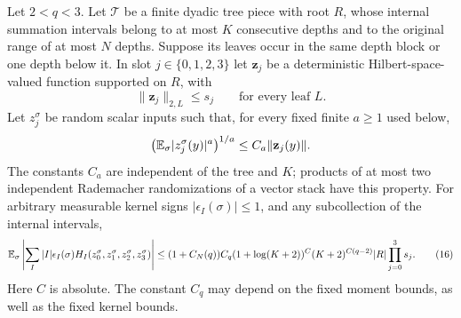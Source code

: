 \begin{lemma}\label{lem:short-block}
Let $2<q<3$.  Let $\mathcal T$ be a finite dyadic tree piece with root
$R$, whose internal summation intervals belong to at most $K$
consecutive depths and to the original range of at most $N$ depths.
Suppose its leaves occur in the same depth block or one depth below
it.  In slot $j\in\{0,1,2,3\}$ let $\mathbf z_j$ be a deterministic
Hilbert-space-valued function supported on $R$, with
\[
 \|\mathbf z_j\|_{2,L}\le s_j
 \qquad\text{for every leaf }L.
\]
Let $z_j^\sigma$ be random scalar inputs such that, for every fixed
finite $a\geq1$ used below,
\[
 \bigl(\mathbb E_\sigma|z_j^\sigma(y)|^a\bigr)^{1/a}
 \le C_a\|\mathbf z_j(y)\|.
\]
The constants $C_a$ are independent of the tree and $K$; products of at
most two independent Rademacher randomizations of a vector stack have
this property.  For arbitrary measurable kernel signs
$|\epsilon_I(\sigma)|\le1$, and any subcollection of the internal
intervals,
\[
 \mathbb E_\sigma\left|
   \sum_I |I|\epsilon_I(\sigma)
             H_I(z_0^\sigma,z_1^\sigma,z_2^\sigma,z_3^\sigma)
             \right|
 \le (1+C_N(q))C_q
       (1+\log(K+2))^C(K+2)^{C(q-2)}
       |R|\prod_{j=0}^3s_j .
 \tag{16}\label{eq:src-16}
\]
Here $C$ is absolute.  The constant $C_q$ may depend on the fixed
moment bounds, as well as the fixed kernel bounds.
\end{lemma}

